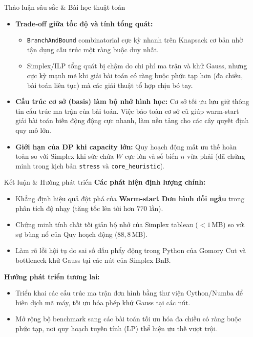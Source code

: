 \documentclass[10pt]{beamer}
\begin{document}
\begin{frame}{Thảo luận sâu sắc \& Bài học thuật toán}
    \begin{itemize}
        \item \textbf{Trade-off giữa tốc độ và tính tổng quát:}
            \begin{itemize}
                \item \texttt{BranchAndBound} combinatorial cực kỳ nhanh trên Knapsack cơ bản nhờ tận dụng cấu trúc một ràng buộc duy nhất.
                \item Simplex/ILP tổng quát bị chậm do chi phí ma trận và khử Gauss, nhưng cực kỳ mạnh mẽ khi giải bài toán có ràng buộc phức tạp hơn (đa chiều, bài toán liên tục) mà các giải thuật tổ hợp chịu bó tay.
            \end{itemize}
        \item \textbf{Cấu trúc cơ sở (basis) làm bộ nhớ hình học:}
            Cơ sở tối ưu lưu giữ thông tin cấu trúc ma trận của bài toán. Việc bảo toàn cơ sở cũ giúp warm-start giải bài toán biến động động cực nhanh, làm nền tảng cho các cây quyết định quy mô lớn.
        \item \textbf{Giới hạn của DP khi capacity lớn:}
            Quy hoạch động mất ưu thế hoàn toàn so với Simplex khi sức chứa $W$ cực lớn và số biến $n$ vừa phải (đã chứng minh trong kịch bản \texttt{stress} và \texttt{core\_heuristic}).
    \end{itemize}
\end{frame}

\begin{frame}{Kết luận \& Hướng phát triển}
    \textbf{Các phát hiện định lượng chính:}
    \begin{itemize}
        \item Khẳng định hiệu quả đột phá của \textbf{Warm-start Đơn hình đối ngẫu} trong phân tích độ nhạy (tăng tốc lên tới hơn $770$ lần).
        \item Chứng minh tính chất tối giản bộ nhớ của Simplex tableau ($< 1$\,MB) so với sự bùng nổ của Quy hoạch động ($88,8$\,MB).
        \item Làm rõ lỗi hội tụ do sai số dấu phẩy động trong Python của Gomory Cut và bottleneck khử Gauss tại các nút của Simplex BnB.
    \end{itemize}
    \vspace{0.3em}
    \textbf{Hướng phát triển tương lai:}
    \begin{itemize}
        \item Triển khai các cấu trúc ma trận đơn hình bằng thư viện Cython/Numba để biên dịch mã máy, tối ưu hóa phép khử Gauss tại các nút.
        \item Mở rộng bộ benchmark sang các bài toán tối ưu hóa đa chiều có ràng buộc phức tạp, nơi quy hoạch tuyến tính (LP) thể hiện ưu thế vượt trội.
    \end{itemize}
\end{frame}
\end{document}
